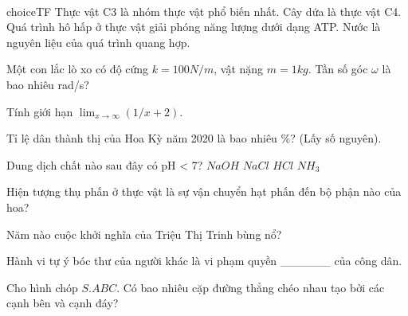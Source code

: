 \begin{ex}
    \\choiceTF
    {\True Thực vật C3 là nhóm thực vật phổ biến nhất.}
    {Cây dứa là thực vật C4.}
    {\True Quá trình hô hấp ở thực vật giải phóng năng lượng dưới dạng ATP.}
    {\True Nước là nguyên liệu của quá trình quang hợp.}
\end{ex}

\begin{ex}
    Một con lắc lò xo có độ cứng $k = 100 N/m$, vật nặng $m = 1 kg$. Tần số góc $\omega$ là bao nhiêu rad/s?
\end{ex}

\begin{ex}
    Tính giới hạn $\lim_{x \to \infty} (1/x + 2)$.
\end{ex}

\begin{ex}
    Tỉ lệ dân thành thị của Hoa Kỳ năm 2020 là bao nhiêu \%? (Lấy số nguyên).
\end{ex}

\begin{ex}
    Dung dịch chất nào sau đây có pH < 7?
    \choice
    {$NaOH$}
    {$NaCl$}
    {\True $HCl$}
    {$NH_3$}
\end{ex}

\begin{ex}
    Hiện tượng thụ phấn ở thực vật là sự vận chuyển hạt phấn đến bộ phận nào của hoa?

\end{ex}

\begin{ex}
    Năm nào cuộc khởi nghĩa của Triệu Thị Trinh bùng nổ?
\end{ex}

\begin{ex}
    Hành vi tự ý bóc thư của người khác là vi phạm quyền ______ của công dân.

\end{ex}

\begin{ex}
    Cho hình chóp $S.ABC$. Có bao nhiêu cặp đường thẳng chéo nhau tạo bởi các cạnh bên và cạnh đáy?
\end{ex}